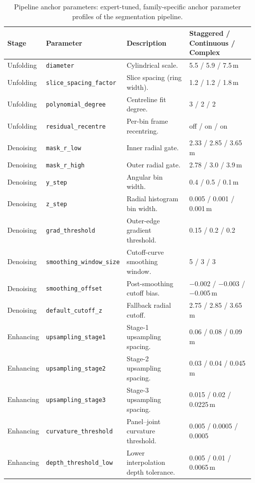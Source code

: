 \documentclass[a4paper,fleqn]{cas-dc}
\begin{document}
{\begin{table}[t]
\caption{Pipeline anchor parameters: expert-tuned, family-specific anchor parameter profiles of the segmentation pipeline.}\label{tab:anchor-params}
\begin{tabular*}{\textwidth}{@{\extracolsep{\fill}} l l p{} l @{}}
\toprule
Stage & Parameter & Description & Staggered / Continuous / Complex \\
\midrule
Unfolding & \texttt{diameter} & Cylindrical scale. & 5.5 / 5.9 / 7.5\,m \\
Unfolding & \texttt{slice\_spacing\_factor} & Slice spacing (ring width). & 1.2 / 1.2 / 1.8\,m \\
Unfolding & \texttt{polynomial\_degree} & Centreline fit degree. & 3 / 2 / 2 \\
Unfolding & \texttt{residual\_recentre} & Per-bin frame recentring. & off / on / on \\
\midrule
Denoising & \texttt{mask\_r\_low} & Inner radial gate. & 2.33 / 2.85 / 3.65\,m \\
Denoising & \texttt{mask\_r\_high} & Outer radial gate. & 2.78 / 3.0 / 3.9\,m \\
Denoising & \texttt{y\_step} & Angular bin width. & 0.4 / 0.5 / 0.1\,m \\
Denoising & \texttt{z\_step} & Radial histogram bin width. & 0.005 / 0.001 / 0.001\,m \\
Denoising & \texttt{grad\_threshold} & Outer-edge gradient threshold. & 0.15 / 0.2 / 0.2 \\
Denoising & \texttt{smoothing\_window\_size} & Cutoff-curve smoothing window. & 5 / 3 / 3 \\
Denoising & \texttt{smoothing\_offset} & Post-smoothing cutoff bias. & $-$0.002 / $-$0.003 / $-$0.005\,m \\
Denoising & \texttt{default\_cutoff\_z} & Fallback radial cutoff. & 2.75 / 2.85 / 3.65\,m \\
\midrule
Enhancing & \texttt{upsampling\_stage1} & Stage-1 upsampling spacing. & 0.06 / 0.08 / 0.09\,m \\
Enhancing & \texttt{upsampling\_stage2} & Stage-2 upsampling spacing. & 0.03 / 0.04 / 0.045\,m \\
Enhancing & \texttt{upsampling\_stage3} & Stage-3 upsampling spacing. & 0.015 / 0.02 / 0.0225\,m \\
Enhancing & \texttt{curvature\_threshold} & Panel--joint curvature threshold. & 0.005 / 0.0005 / 0.0005 \\
Enhancing & \texttt{depth\_threshold\_low} & Lower interpolation depth tolerance. & 0.005 / 0.01 / 0.0065\,m \\

\end{tabular*}
\end{table}}
\end{document}
